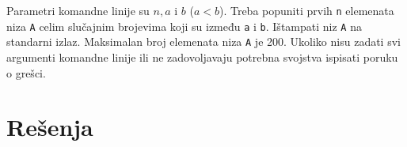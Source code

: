 \fi

\begin{Exercise}[label=v2.2_01] 
Parametri komandne linije su $n, a$ i $b$ ($a < b$). Treba popuniti
prvih {\tt n} elemenata niza {\tt A} celim slu\v cajnim brojevima koji
su između {\tt a} i {\tt b}. I\v stampati niz {\tt A} na standarni
izlaz. Maksimalan broj elemenata niza {\tt A} je 200. Ukoliko nisu
zadati svi argumenti komandne linije ili ne zadovoljavaju potrebna
svojstva ispisati poruku o gre\v sci. 

\end{Exercise}



\ifresenja
\section{Rešenja}
\shipoutAnswer
\fi
